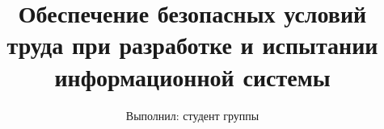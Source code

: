 


\title{Обеспечение безопасных условий труда при разработке и испытании информационной системы}
\author{Выполнил: студент группы \mygroup{} \me{}}
\date{}



\maketitle







